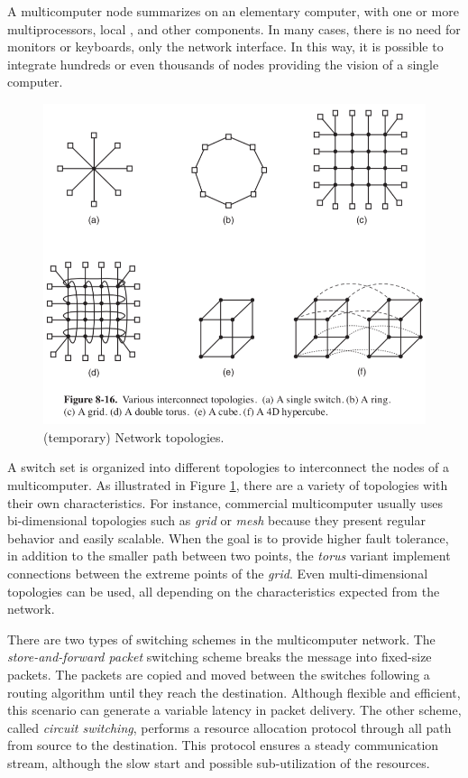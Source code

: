 				A multicomputer node summarizes on an elementary computer, with one or
				more multiprocessors, local \ram, and other components.
				In many cases, there is no need for monitors or keyboards, only the
				network interface.
				In this way, it is possible to integrate hundreds or even thousands
				of nodes providing the vision of a single computer.

				\begin{figure}[h]
					\centering
					\includegraphics[width=.8\textwidth]{images/net-topologies.png}

					\caption{
						(temporary) Network topologies.
					}\par
					\label{fig.net_topologies}
				\end{figure}
				
				A switch set is organized into different topologies to interconnect
				the nodes of a multicomputer.
				As illustrated in Figure \ref{fig.net_topologies}, there are a
				variety of topologies with their own characteristics.
				For instance, commercial multicomputer usually uses bi-dimensional
				topologies such as \textit{grid} or \textit{mesh} because they present
				regular behavior and easily scalable.
				When the goal is to provide higher fault tolerance, in addition to the
				smaller path between two points, the \textit{torus} variant implement
				connections between the extreme points of the \textit{grid}.
				Even multi-dimensional topologies can be used, all depending on the
				characteristics expected from the network.

				There are two types of switching schemes in the multicomputer network.
				The \textit{store-and-forward packet} switching scheme breaks the message
				into fixed-size packets.
				The packets are copied and moved between the switches following a
				routing algorithm until they reach the destination.
				Although flexible and efficient, this scenario can generate a variable
				latency in packet delivery.
				The other scheme, called \textit{circuit switching}, performs a resource
				allocation protocol through all path from source to the destination.
				This protocol ensures a steady communication stream, although the
				slow start and possible sub-utilization of the resources.


